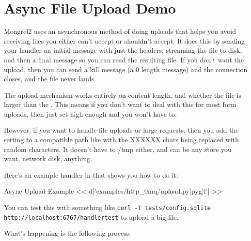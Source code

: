 \section{Async File Upload Demo}

Mongrel2 uses an asynchronous method of doing uploads that helps you 
avoid receiving files you either can't accept or shouldn't accept.  It does
this by sending your handler an initial message with just the headers, streaming
the file to disk, and then a final message so you can read the resulting file.
If you don't want the upload, then you can send a kill message (a 0 length message)
and the connection closes, and the file never lands.

The upload mechanism works entirely on content length, and whether the file
is larger than the .  This means if you don't
want to deal with this for most form uploads, then just set 
high enough and you won't have to.

However, if you want to handle file uploads or large requests, then you add
the setting  to a  compatible path
like  with the XXXXXX chars being replaced
with random characters.  It doesn't have to /tmp either, and can be any store
you want, network disk, anything.

Here's an example handler in  that shows
you how to do it:

\begin{code}{Async Upload Example}
<< d['examples/http_0mq/upload.py|pyg|l'] >>
\end{code}

You can test this with something like
\verb|curl -T tests/config.sqlite http://localhost:6767/handlertest| to upload a big file.

What's happening is the following process:

